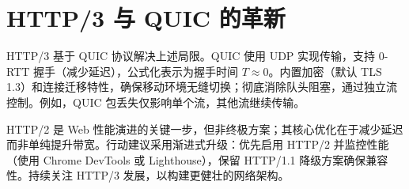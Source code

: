 \section{HTTP/3 与 QUIC 的革新}
HTTP/3 基于 QUIC 协议解决上述局限。QUIC 使用 UDP 实现传输，支持 0-RTT 握手（减少延迟），公式化表示为握手时间 $T \approx 0$。内置加密（默认 TLS 1.3）和连接迁移特性，确保移动环境无缝切换；彻底消除队头阻塞，通过独立流控制。例如，QUIC 包丢失仅影响单个流，其他流继续传输。\par
HTTP/2 是 Web 性能演进的关键一步，但非终极方案；其核心优化在于减少延迟而非单纯提升带宽。行动建议采用渐进式升级：优先启用 HTTP/2 并监控性能（使用 Chrome DevTools 或 Lighthouse），保留 HTTP/1.1 降级方案确保兼容性。持续关注 HTTP/3 发展，以构建更健壮的网络架构。\par
